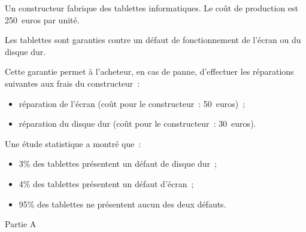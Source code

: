 
\par
\par
Un constructeur fabrique des tablettes informatiques. Le coût de production est 250~euros par unité.
\par
Les tablettes sont garanties contre un défaut de fonctionnement de l'écran ou du disque dur.
\par
Cette garantie permet à l'acheteur, en cas de panne, d'effectuer les réparations suivantes aux frais du constructeur~:
\begin{itemize}
     \item réparation de l'écran (coût pour le constructeur~: 50~euros)~;
     \item réparation du disque dur (coût pour le constructeur~: 30~euros).
\end{itemize}
Une étude statistique a montré que~:
\begin{itemize}
     \item 3\% des tablettes présentent un défaut de disque dur~;
     \item 4\% des tablettes présentent un défaut d'écran~;
     \item 95\% des tablettes ne présentent aucun des deux défauts.
\end{itemize}
%
\begin{center}\begin{h3}Partie A \end{h3}\end{center}
%
